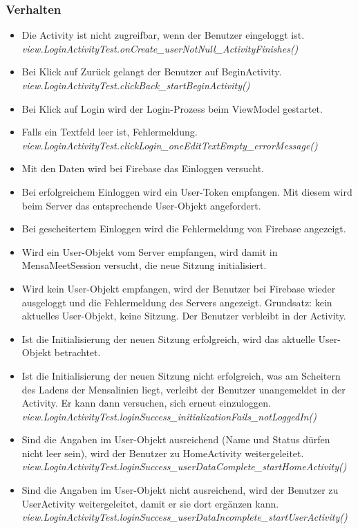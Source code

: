 \documentclass[a4paper]{scrreprt}
\begin{document}
\subsubsection{Verhalten}
\begin{itemize}
\item Die Activity ist nicht zugreifbar, wenn der Benutzer eingeloggt ist.\\
\textit{view.LoginActivityTest.onCreate\_userNotNull\_ActivityFinishes()}
\item Bei Klick auf Zurück gelangt der Benutzer auf BeginActivity.\\
\textit{view.LoginActivityTest.clickBack\_startBeginActivity()}
\item Bei Klick auf Login wird der Login-Prozess beim ViewModel gestartet.
\item Falls ein Textfeld leer ist, Fehlermeldung.\\
\textit{view.LoginActivityTest.clickLogin\_oneEditTextEmpty\_errorMessage()}
\item Mit den Daten wird bei Firebase das Einloggen versucht. 
\item Bei erfolgreichem Einloggen wird ein User-Token empfangen. Mit diesem wird beim Server das entsprechende User-Objekt angefordert.
\item Bei gescheitertem Einloggen wird die Fehlermeldung von Firebase angezeigt.
\item Wird ein User-Objekt vom Server empfangen, wird damit in MensaMeetSession versucht, die neue Sitzung initialisiert. 
\item Wird kein User-Objekt empfangen, wird der Benutzer bei Firebase wieder ausgeloggt und die Fehlermeldung des Servers angezeigt. Grundsatz: kein aktuelles User-Objekt, keine Sitzung. Der Benutzer verbleibt in der Activity.
\item Ist die Initialisierung der neuen Sitzung erfolgreich, wird das aktuelle User-Objekt betrachtet.
\item Ist die Initialisierung der neuen Sitzung nicht erfolgreich, was am Scheitern des Ladens der Mensalinien liegt, verleibt der Benutzer unangemeldet in der Activity. Er kann dann versuchen, sich erneut einzuloggen. \\
\textit{view.LoginActivityTest.loginSuccess\_initializationFails\_notLoggedIn()}
\item Sind die Angaben im User-Objekt ausreichend (Name und Status dürfen nicht leer sein), wird der Benutzer zu HomeActivity weitergeleitet.\\
\textit{view.LoginActivityTest.loginSuccess\_userDataComplete\_startHomeActivity()}
\item Sind die Angaben im User-Objekt nicht ausreichend, wird der Benutzer zu UserActivity weitergeleitet, damit er sie dort ergänzen kann.\\
\textit{view.LoginActivityTest.loginSuccess\_userDataIncomplete\_startUserActivity()}

\end{itemize}
\end{document}
